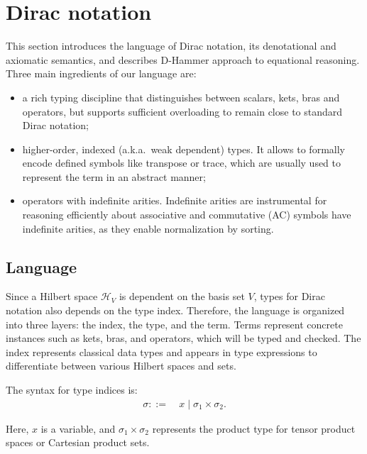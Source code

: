 
\section{Dirac notation}
This section introduces the language of Dirac notation, its
denotational and axiomatic semantics, and describes D-Hammer approach
to equational reasoning. Three main ingredients of our language are:
\begin{itemize}
\item a rich typing discipline that distinguishes between scalars,
  kets, bras and operators, but supports sufficient overloading to
  remain close to standard Dirac notation;
\item higher-order, indexed (a.k.a.\, weak dependent) types. It allows
  to formally encode defined symbols like transpose or trace, which
  are usually used to represent the term in an abstract manner;
\item operators with indefinite arities. Indefinite arities are
  instrumental for reasoning efficiently about associative and
  commutative (AC) symbols have indefinite arities, as they enable
  normalization by sorting.
\end{itemize}

\subsection{Language}
Since a Hilbert space $\mathcal{H}_V$ is dependent on the basis set
$V$, types for Dirac notation also depends on the type index.
Therefore, the language is organized into three layers: the index, the
type, and the term.  Terms represent concrete instances such as kets,
bras, and operators, which will be typed and checked. The index
represents classical data types and appears in type expressions to
differentiate between various Hilbert spaces and sets.

\begin{definition}
    The syntax for type indices is:
    \begin{align*}
        \sigma ::=\ & x \mid \sigma_1 \times \sigma_2.
    \end{align*}
\end{definition}
Here, \( x \) is a variable, and \( \sigma_1 \times \sigma_2 \) represents the product type for tensor product spaces or Cartesian product sets.

